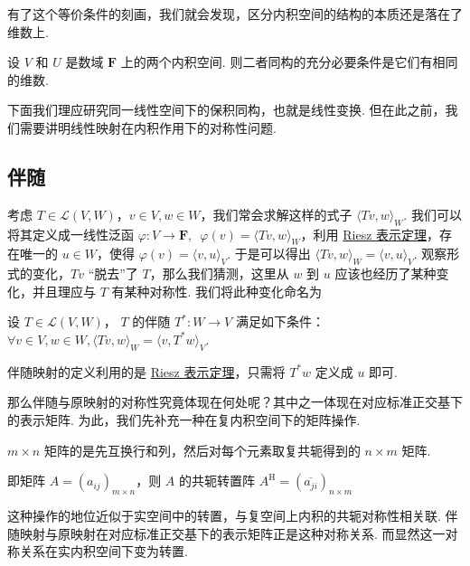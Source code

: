 有了这个等价条件的刻画，我们就会发现，区分内积空间的结构的本质还是落在了维数上.

\begin{theorem}
    设 $ V $ 和 $ U $ 是数域 $ \mathbf{F} $ 上的两个内积空间. 则二者同构的充分必要条件是它们有相同的维数.
\end{theorem}

下面我们理应研究同一线性空间下的保积同构，也就是线性变换. 但在此之前，我们需要讲明线性映射在内积作用下的对称性问题.

\subsection{伴随}

考虑 $ T \in \mathcal{L}(V, W) $，$ v \in V, w \in W $，我们常会求解这样的式子 $ \langle Tv, w \rangle_W $. 我们可以将其定义成一线性泛函 $ \varphi : V \rightarrow \mathbf{F}, \enspace \varphi (v) = \langle Tv, w \rangle_W $，利用 \hyperref[thm:23:Riesz]{Riesz 表示定理}，存在唯一的 $ u \in W $，使得 $ \varphi (v) = \langle v, u \rangle_V $. 于是可以得出 $ \langle Tv, w \rangle_W = \langle v, u \rangle_V $. 观察形式的变化，$ Tv $ “脱去”了 $ T $，那么我们猜测，这里从 $ w $ 到 $ u $ 应该也经历了某种变化，并且理应与 $ T $ 有某种对称性. 我们将此种变化命名为

\begin{definition}[伴随] 
    设 $ T \in \mathcal{L}(V, W) $， $ T $ 的伴随 $ T^*: W \rightarrow V $ 满足如下条件： $ \forall v \in V, w \in W, \langle Tv, w \rangle_W = \langle v, T^*w \rangle_V $.
\end{definition}

伴随映射的定义利用的是 \hyperref[thm:23:Riesz]{Riesz 表示定理}，只需将 $ T^*w $ 定义成 $ u $ 即可.

那么伴随与原映射的对称性究竟体现在何处呢？其中之一体现在对应标准正交基下的表示矩阵. 为此，我们先补充一种在复内积空间下的矩阵操作.

\begin{definition}[共轭转置] 
    $ m \times n $ 矩阵的是先互换行和列，然后对每个元素取复共轭得到的 $ n \times m $ 矩阵.

    即矩阵 $ A = (a_{ij})_{m \times n} $，则 $ A $ 的共轭转置阵 $ A^{\mathrm{H}} = (\overline{a_{ji}})_{n \times m} $
\end{definition}

这种操作的地位近似于实空间中的转置，与复空间上内积的共轭对称性相关联. 伴随映射与原映射在对应标准正交基下的表示矩阵正是这种对称关系. 而显然这一对称关系在实内积空间下变为转置.

